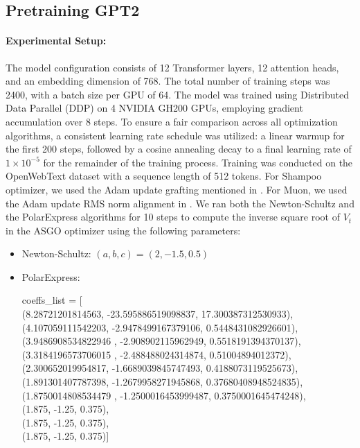 \documentclass{article}
\theoremstyle{remark}
\begin{document}
\subsection{Pretraining GPT2}
\paragraph{Experimental Setup: }
The model configuration consists of 12 Transformer layers, 12 attention heads, and an embedding dimension of 768. The total number of training steps was 2400, with a batch size per GPU of 64. The model was trained using Distributed Data Parallel (DDP) on 4 NVIDIA GH200 GPUs, employing gradient accumulation over 8 steps. To ensure a fair comparison across all optimization algorithms, a consistent learning rate schedule was utilized: a linear warmup for the first 200 steps, followed by a cosine annealing decay to a final learning rate of $1\times 10^{-5}$ for the remainder of the training process. Training was conducted on the OpenWebText dataset with a sequence length of 512 tokens. For Shampoo optimizer, we used the Adam update grafting mentioned in \citep{shi2023distributed, eschenhagen2025purifyingshampooinvestigatingshampoos}. For Muon, we used the Adam update RMS norm alignment in \citep{liu2025muon}. We ran both the Newton-Schultz and the PolarExpress algorithms for 10 steps to compute the inverse square root of $V_t$ in the ASGO optimizer using the following parameters:

\begin{itemize}
    \item Newton-Schultz: $(a,b,c) = (2, -1.5, 0.5)$
    \item PolarExpress: 
    
    coeffs\_list = [ \\
    (8.28721201814563, -23.595886519098837, 17.300387312530933), \\
    (4.107059111542203, -2.9478499167379106, 0.5448431082926601), \\
    (3.9486908534822946 , -2.908902115962949, 0.5518191394370137), \\
    (3.3184196573706015 , -2.488488024314874, 0.51004894012372), \\
    (2.300652019954817, -1.6689039845747493, 0.4188073119525673), \\
    (1.891301407787398, -1.2679958271945868, 0.37680408948524835), \\
    (1.8750014808534479 , -1.2500016453999487, 0.3750001645474248), \\
    (1.875, -1.25, 0.375), \\
    (1.875, -1.25, 0.375), \\
    (1.875, -1.25, 0.375)]  
\end{itemize}
\end{document}
